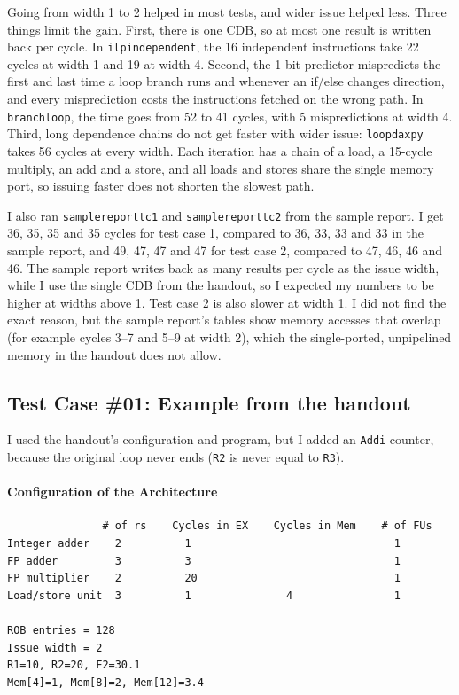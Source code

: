 \documentclass[11pt]{article}
\renewcommand{\_}{\origunderscore\allowbreak}
\begin{document}
Going from width 1 to 2 helped in most tests, and wider issue helped less. Three things limit
the gain. First, there is one CDB, so at most one result is written back per cycle. In
\texttt{ilp\_independent}, the 16 independent instructions take 22 cycles
at width 1 and 19 at width 4. Second, the 1-bit predictor mispredicts the
first and last time a loop branch runs and whenever an if/else changes direction, and every
misprediction costs the instructions fetched on the wrong path. In \texttt{branch\_loop}, the
time goes from 52 to 41 cycles, with 5
mispredictions at width 4.
Third, long dependence chains do not get faster with wider issue: \texttt{loop\_daxpy} takes
56 cycles at every width. Each iteration has a chain of a load, a 15-cycle
multiply, an add and a store, and all loads and stores share the single memory port, so issuing
faster does not shorten the slowest path.

I also ran \texttt{sample\_report\_tc1} and \texttt{sample\_report\_tc2} from the sample report.
I get 36, 35, 35 and
35 cycles for test case 1, compared to 36, 33, 33 and 33 in the sample
report, and 49, 47, 47
and 47 for test case 2, compared to 47, 46, 46 and 46. The sample report
writes back as many results per cycle as the issue width, while I use the single CDB from the
handout, so I expected my numbers to be higher at widths above 1. Test case 2 is also slower at
width 1. I did not find the exact reason, but the sample report's tables show memory accesses
that overlap (for example cycles 3--7 and 5--9 at width 2), which the single-ported, unpipelined
memory in the handout does not allow.

\subsection{Test Case \#01: Example from the handout}

I used the handout's configuration and program, but I added an \texttt{Addi} counter, because
the original loop never ends (\texttt{R2} is never equal to \texttt{R3}).

\paragraph{Configuration of the Architecture}
\begin{verbatim}
               # of rs    Cycles in EX    Cycles in Mem    # of FUs
Integer adder    2          1                                1
FP adder         3          3                                1
FP multiplier    2          20                               1
Load/store unit  3          1               4                1

ROB entries = 128
Issue width = 2
R1=10, R2=20, F2=30.1
Mem[4]=1, Mem[8]=2, Mem[12]=3.4
\end{verbatim}
\end{document}
